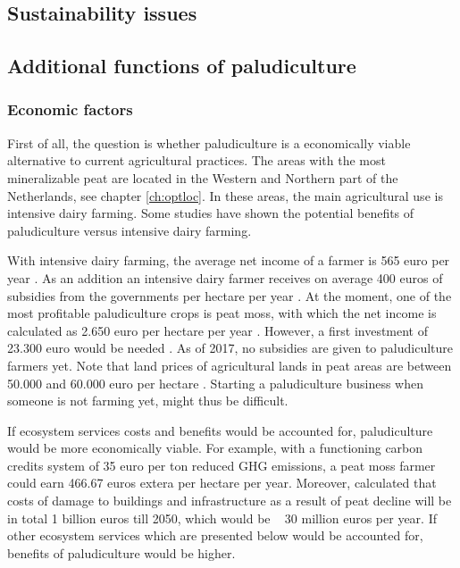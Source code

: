 {\begin{enumerate}
\chapter{Sustainability issues}

\section{Additional functions of paludiculture}

\subsection{Economic factors}
First of all, the question is whether paludiculture is a economically viable alternative to current agricultural practices. The areas with the most mineralizable peat are located in the Western and Northern part of the Netherlands, see chapter \ref{ch:optloc}. In these areas, the main agricultural use is intensive dairy farming. Some studies have shown the potential benefits of paludiculture versus intensive dairy farming. 

With intensive dairy farming, the average net income of a farmer is 565 euro per year \citep{van2013rewetting}. As an addition an intensive dairy farmer receives on average 400 euros of subsidies from the governments per hectare per year \citep{van2013rewetting}. At the moment, one of the most profitable paludiculture crops is peat moss, with which the net income is calculated as 2.650 euro per hectare per year \citep{van2013rewetting}. However, a first investment of 23.300 euro would be needed \citep{van2013rewetting}. As of 2017, no subsidies are given to paludiculture farmers yet. Note that land prices of agricultural lands in peat areas are between 50.000 and 60.000 euro per hectare \citep{}. Starting a paludiculture business when someone is not farming yet, might thus be difficult.

If ecosystem services costs and benefits would be accounted for, paludiculture would be more economically viable. For example, with a functioning carbon credits system of 35 euro per ton reduced GHG emissions, a peat moss farmer could earn 466.67 euros extera per hectare per year. Moreover, \citet{van2016dalende} calculated that costs of damage to buildings and infrastructure as a result of peat decline will be in total 1 billion euros till 2050, which would be ~ 30 million euros per year. If other ecosystem services which are presented below would be accounted for, benefits of paludiculture would be higher.


\end{enumerate}}

